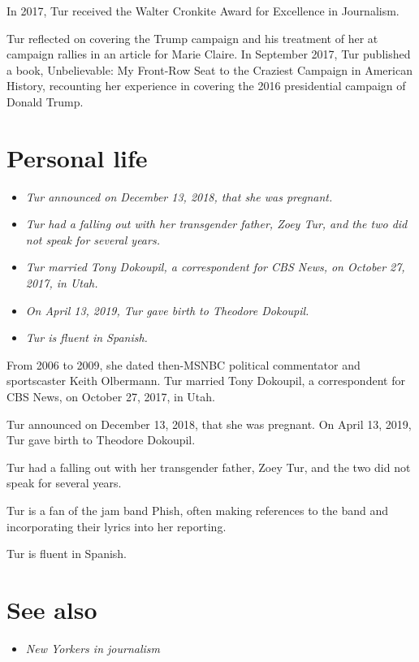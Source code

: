 In 2017, Tur received the Walter Cronkite Award for Excellence in
Journalism.

Tur reflected on covering the Trump campaign and his treatment of her at
campaign rallies in an article for Marie Claire. In September 2017, Tur
published a book, Unbelievable: My Front-Row Seat to the Craziest
Campaign in American History, recounting her experience in covering the
2016 presidential campaign of Donald Trump.

\section{Personal life}\label{personal-life}

\begin{itemize}
\item
  \emph{Tur announced on December 13, 2018, that she was pregnant.}
\item
  \emph{Tur had a falling out with her transgender father, Zoey Tur, and
  the two did not speak for several years.}
\item
  \emph{Tur married Tony Dokoupil, a correspondent for CBS News, on
  October 27, 2017, in Utah.}
\item
  \emph{On April 13, 2019, Tur gave birth to Theodore Dokoupil.}
\item
  \emph{Tur is fluent in Spanish.}
\end{itemize}

From 2006 to 2009, she dated then-MSNBC political commentator and
sportscaster Keith Olbermann. Tur married Tony Dokoupil, a correspondent
for CBS News, on October 27, 2017, in Utah.

Tur announced on December 13, 2018, that she was pregnant. On April 13,
2019, Tur gave birth to Theodore Dokoupil.

Tur had a falling out with her transgender father, Zoey Tur, and the two
did not speak for several years.

Tur is a fan of the jam band Phish, often making references to the band
and incorporating their lyrics into her reporting.

Tur is fluent in Spanish.

\section{See also}\label{see-also}

\begin{itemize}
\item
  \emph{New Yorkers in journalism}
\end{itemize}


